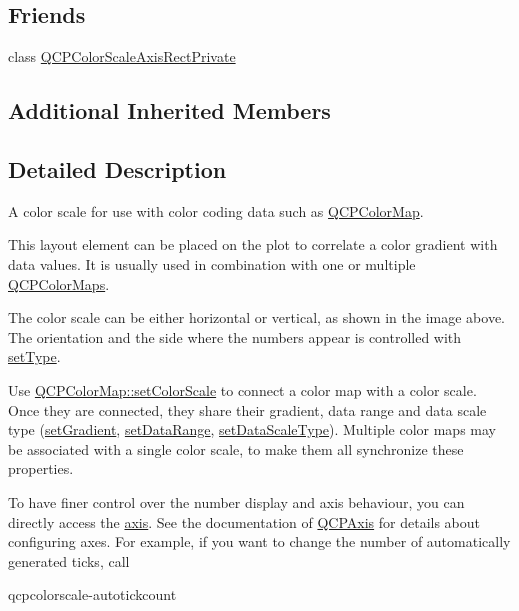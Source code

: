 \subsection*{Friends}
\begin{DoxyCompactItemize}
\item 
class \hyperlink{class_q_c_p_color_scale_a1441d8c09d7227c0c29a8d0a96d55bfe}{Q\+C\+P\+Color\+Scale\+Axis\+Rect\+Private}
\end{DoxyCompactItemize}
\subsection*{Additional Inherited Members}


\subsection{Detailed Description}
A color scale for use with color coding data such as \hyperlink{class_q_c_p_color_map}{Q\+C\+P\+Color\+Map}. 

This layout element can be placed on the plot to correlate a color gradient with data values. It is usually used in combination with one or multiple \hyperlink{class_q_c_p_color_map}{Q\+C\+P\+Color\+Maps}.



The color scale can be either horizontal or vertical, as shown in the image above. The orientation and the side where the numbers appear is controlled with \hyperlink{class_q_c_p_color_scale_a1bf9bdb291927c422dd66b404b206f1f}{set\+Type}.

Use \hyperlink{class_q_c_p_color_map_aa828921db364fe3c6af4619580ab85fd}{Q\+C\+P\+Color\+Map\+::set\+Color\+Scale} to connect a color map with a color scale. Once they are connected, they share their gradient, data range and data scale type (\hyperlink{class_q_c_p_color_scale_a1f29583bb6f1e7f473b62fb712be3940}{set\+Gradient}, \hyperlink{class_q_c_p_color_scale_abe88633003a26d1e756aa74984587fef}{set\+Data\+Range}, \hyperlink{class_q_c_p_color_scale_aeb6107d67dd7325145b2498abae67fc3}{set\+Data\+Scale\+Type}). Multiple color maps may be associated with a single color scale, to make them all synchronize these properties.

To have finer control over the number display and axis behaviour, you can directly access the \hyperlink{class_q_c_p_color_scale_a1205bd67c8a33d5818aac1f6eea016a4}{axis}. See the documentation of \hyperlink{class_q_c_p_axis}{Q\+C\+P\+Axis} for details about configuring axes. For example, if you want to change the number of automatically generated ticks, call 
\begin{DoxyCodeInclude}
\end{DoxyCodeInclude}
qcpcolorscale-\/autotickcount

